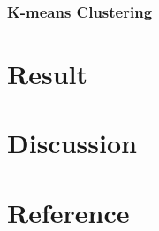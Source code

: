 \documentclass[12pt,a4paper]{article}
\begin{document}
\subsubsection{K-means Clustering}

\section{Result}

\section{Discussion}

\section{Reference}
\end{document}
